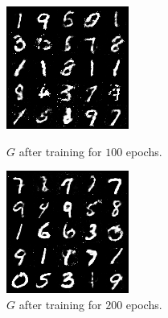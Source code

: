 \documentclass[12pt]{article}
\begin{document}
\begin{figure}[t]
\begin{minipage}{0.3\textwidth}
        \includegraphics[width=\textwidth]{100.png}
        \caption{\(G\) after training for \(100\) epochs.}
        \label{fig:p5}
    \end{minipage}
    \hfill
    \begin{minipage}{0.3\textwidth}
        \centering
        \includegraphics[width=\textwidth]{199.png}
        \caption{\(G\) after training for \(200\) epochs.}
        \label{fig:p6}
    \end{minipage}
\end{figure}
\end{document}
